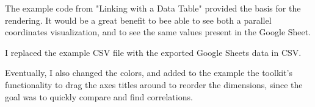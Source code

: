 The example code from "Linking with a Data Table" provided the basis for the rendering. It would be a great benefit to bee able to see both a parallel coordinates visualization, and to see the same values present in the Google Sheet. %

I replaced the example CSV file with the exported Google Sheets data in CSV.

Eventually, I also changed the colors, and added to the example the toolkit's functionality to drag the axes titles around to reorder the dimensions, since the goal was to quickly compare and find correlations.


